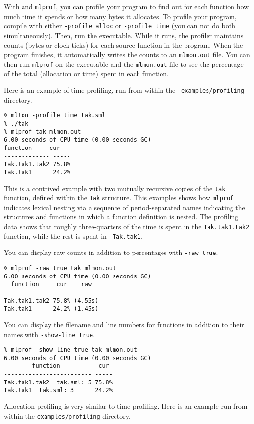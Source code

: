 %
With {\mlton} and {\tt mlprof}, you can profile your program to find
out for each function how much time it spends or how many bytes it
allocates.  To profile your program, compile with either {\tt -profile
alloc} or {\tt -profile time} (you can not do both simultaneously).
Then, run the executable.  While it runs, the profiler maintains
counts (bytes or clock ticks) for each source function in the program.
When the program finishes, it automatically writes the counts to an
{\tt mlmon.out} file.  You can then run {\tt mlprof} on the executable
and the {\tt mlmon.out} file to see the percentage of the total
(allocation or time) spent in each function.

Here is an example of time profiling, run from within the {\tt
examples/profiling} directory.
\begin{verbatim}
% mlton -profile time tak.sml
% ./tak
% mlprof tak mlmon.out
6.00 seconds of CPU time (0.00 seconds GC)
function     cur 
------------- -----
Tak.tak1.tak2 75.8%
Tak.tak1      24.2%
\end{verbatim}
This is a contrived example with two mutually recursive copies of the
{\tt tak} function, defined within the {\tt Tak} structure.  This
examples shows how {\tt mlprof} indicates lexical nesting via a
sequence of period-separated names indicating the structures and
functions in which a function definition is nested.  The profiling
data shows that roughly three-quarters of the time is spent in the
{\tt Tak.tak1.tak2} function, while the rest is spent in {\tt
Tak.tak1}.

You can display raw counts in addition to percentages with {\tt -raw
true}.
\begin{verbatim}
% mlprof -raw true tak mlmon.out
6.00 seconds of CPU time (0.00 seconds GC)
  function     cur    raw  
------------- ----- -------
Tak.tak1.tak2 75.8% (4.55s)
Tak.tak1      24.2% (1.45s)
\end{verbatim}
%
You can display the filename and line numbers for functions in addition
to their names with {\tt -show-line true}.
\begin{verbatim}
% mlprof -show-line true tak mlmon.out
6.00 seconds of CPU time (0.00 seconds GC)
        function           cur 
------------------------- -----
Tak.tak1.tak2  tak.sml: 5 75.8%
Tak.tak1  tak.sml: 3      24.2%
\end{verbatim}

Allocation profiling is very similar to time profiling.  Here is an
example run from within the {\tt examples/profiling} directory.

